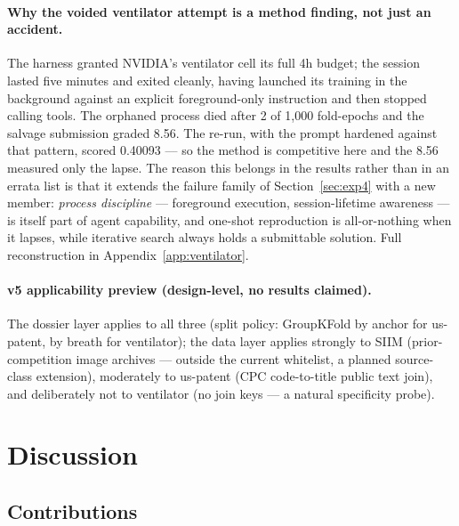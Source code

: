 \documentclass[11pt,a4paper]{article}
\begin{document}
\paragraph{Why the voided ventilator attempt is a method finding, not just an accident.} The
harness granted NVIDIA's ventilator cell its full 4h budget; the session lasted five minutes and
exited cleanly, having launched its training in the background against an explicit
foreground-only instruction and then stopped calling tools. The orphaned process died after 2 of
1{,}000 fold-epochs and the salvage submission graded 8.56. The re-run, with the prompt hardened
against that pattern, scored 0.40093 --- so the method is competitive here and the 8.56 measured
only the lapse. The reason this belongs in the results rather than in an errata list is that it
extends the failure family of Section~\ref{sec:exp4} with a new member: \emph{process
discipline} --- foreground execution, session-lifetime awareness --- is itself part of agent
capability, and one-shot reproduction is all-or-nothing when it lapses, while iterative search
always holds a submittable solution. Full reconstruction in Appendix~\ref{app:ventilator}.

\paragraph{v5 applicability preview (design-level, no results claimed).} The dossier layer applies to all three (split policy: GroupKFold by anchor for us-patent, by breath for ventilator); the data layer applies strongly to SIIM (prior-competition image archives --- outside the current whitelist, a planned source-class extension), moderately to us-patent (CPC code-to-title public text join), and deliberately not to ventilator (no join keys --- a natural specificity probe).

\section{Discussion}

\subsection{Contributions}
\end{document}
